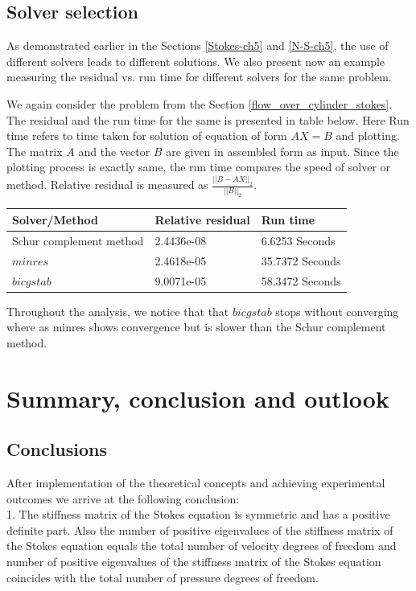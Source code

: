 \documentclass[a4paper,openany]{book}
\begin{document}
\section{Solver selection}

As demonstrated earlier in the Sections \ref{Stokes-ch5} and \ref{N-S-ch5}, the use of different solvers leads to different solutions. We also present now an example measuring the residual vs. run time for different solvers for the same problem.

We again consider the problem from the Section \ref{flow_over_cylinder_stokes}. The residual and the run time for the same is presented in table below.
Here Run time refers to time taken for solution of equation of form $AX = B$ and plotting.  The matrix $A$ and the vector $B$ are given in assembled form as input. Since the plotting process is exactly same, the run time compares the speed of solver or method. Relative residual is measured as $\frac{||B-AX||_2}{||B||_2}$.

\begin{longtable}{| p{} | p{} | p{} |}
\hline
\textbf{Solver/Method} & \textbf{Relative residual} & \textbf{Run time}\\
\hline
Schur complement method & 2.4436e-08 & 6.6253 Seconds\\
\hline
$minres$ & 2.4618e-05 & 35.7372 Seconds\\
\hline
$bicgstab$ & 9.0071e-05 & 58.3472 Seconds\\
\hline
\end{longtable}

Throughout the analysis, we notice that that $bicgstab$ stops without converging where as minres shows convergence but is slower than the Schur complement method.

\chapter{Summary, conclusion and outlook}

\section{Conclusions}

After implementation of the theoretical concepts and achieving experimental outcomes we arrive at the following conclusion: \\

1. The stiffness matrix of the Stokes equation is symmetric and has a positive definite part. Also the number of positive eigenvalues of the stiffness matrix of the Stokes equation equals the total number of velocity degrees of freedom and number of positive eigenvalues of the stiffness matrix of the Stokes equation coincides with the total number of pressure degrees of freedom.\\
\end{document}

